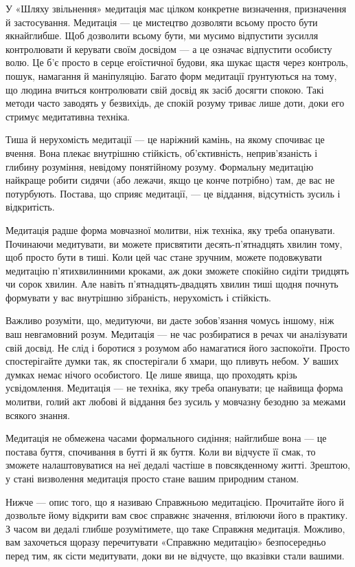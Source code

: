У «Шляху звільнення» медитація має цілком конкретне визначення, призначення й застосування. Медитація — це мистецтво дозволяти всьому просто бути якнайглибше. Щоб дозволити всьому бути, ми мусимо відпустити зусилля контролювати й керувати своїм досвідом — а це означає відпустити особисту волю. Це б'є просто в серце егоїстичної будови, яка шукає щастя через контроль, пошук, намагання й маніпуляцію. Багато форм медитації ґрунтуються на тому, що людина вчиться контролювати свій досвід як засіб досягти спокою. Такі методи часто заводять у безвихідь, де спокій розуму триває лише доти, доки его стримує медитативна техніка.

Тиша й нерухомість медитації — це наріжний камінь, на якому спочиває це вчення. Вона плекає внутрішню стійкість, об'єктивність, неприв'язаність і глибину розуміння, невідому понятійному розуму. Формальну медитацію найкраще робити сидячи (або лежачи, якщо це конче потрібно) там, де вас не потурбують. Постава, що сприяє медитації, — це віддання, відсутність зусиль і відкритість.

Медитація радше форма мовчазної молитви, ніж техніка, яку треба опанувати. Починаючи медитувати, ви можете присвятити десять-п'ятнадцять хвилин тому, щоб просто бути в тиші. Коли цей час стане зручним, можете подовжувати медитацію п'ятихвилинними кроками, аж доки зможете спокійно сидіти тридцять чи сорок хвилин. Але навіть п'ятнадцять-двадцять хвилин тиші щодня почнуть формувати у вас внутрішню зібраність, нерухомість і стійкість.

Важливо розуміти, що, медитуючи, ви даєте зобов'язання чомусь іншому, ніж ваш невгамовний розум. Медитація — не час розбиратися в речах чи аналізувати свій досвід. Не слід і боротися з розумом або намагатися його заспокоїти. Просто спостерігайте думки так, як спостерігали б хмари, що пливуть небом. У ваших думках немає нічого особистого. Це лише явища, що проходять крізь усвідомлення. Медитація — не техніка, яку треба опанувати; це найвища форма молитви, голий акт любові й віддання без зусиль у мовчазну безодню за межами всякого знання.

Медитація не обмежена часами формального сидіння; найглибше вона — це постава буття, спочивання в бутті й як буття. Коли ви відчуєте її смак, то зможете налаштовуватися на неї дедалі частіше в повсякденному житті. Зрештою, у стані визволення медитація просто стане вашим природним станом.

Нижче — опис того, що я називаю Справжньою медитацією. Прочитайте його й дозвольте йому відкрити вам своє справжнє значення, втілюючи його в практику. З часом ви дедалі глибше розумітимете, що таке Справжня медитація. Можливо, вам захочеться щоразу перечитувати «Справжню медитацію» безпосередньо перед тим, як сісти медитувати, доки ви не відчуєте, що вказівки стали вашими.

